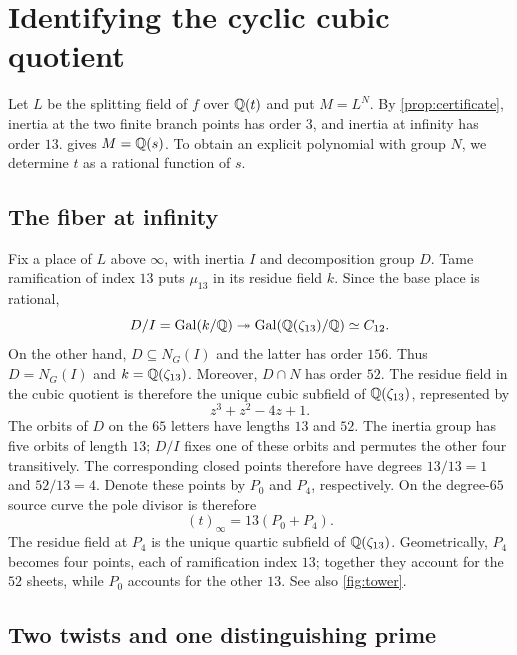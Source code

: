 \section{Identifying the cyclic cubic quotient}\label{sec:quotient}

Let $L$ be the splitting field of $f$ over $\mathbb{Q}(t)$ and put $M=L^N$.
By \cref{prop:certificate}, inertia at the two finite branch points has
order $3$, and inertia at infinity has order $13$.
 gives $M=\mathbb{Q}(s)$. To obtain an explicit
polynomial with group $N$, we determine $t$ as a rational function of $s$.

\subsection{The fiber at infinity}\label{sec:infinity}

Fix a place of $L$ above $\infty$, with inertia $I$ and decomposition
group $D$. Tame ramification of index $13$ puts $\mu_{13}$ in its residue
field $k$. Since the base place is rational,
\[
 D/I=\operatorname{Gal}(k/\mathbb{Q})\twoheadrightarrow
 \operatorname{Gal}(\mathbb{Q}(\zeta_{13})/\mathbb{Q})\simeq C_{12}.
\]
On the other hand, $D\subseteq N_G(I)$ and the latter has order $156$.
Thus $D=N_G(I)$ and $k=\mathbb{Q}(\zeta_{13})$.
Moreover, $D\cap N$ has order $52$. The residue field in the cubic
quotient is therefore the unique cubic subfield of $\mathbb{Q}(\zeta_{13})$,
represented by
\[
 z^3+z^2-4z+1.
\]
The orbits of $D$ on the $65$ letters have lengths $13$ and $52$.
The inertia group has five orbits of length $13$; $D/I$ fixes one of
these orbits and permutes the other four transitively. The corresponding
closed points therefore have degrees $13/13=1$ and $52/13=4$.
Denote these points by $P_0$ and $P_4$, respectively. On the degree-$65$
source curve the pole divisor is therefore
\begin{equation}\label{eq:polefiber}
 (t)_\infty=13(P_0+P_4).
\end{equation}
The residue field at $P_4$ is the unique quartic subfield of
$\mathbb{Q}(\zeta_{13})$. Geometrically, $P_4$ becomes four points, each of
ramification index $13$; together they account for the $52$ sheets,
while $P_0$ accounts for the other $13$. See also \cref{fig:tower}.

\subsection{Two twists and one distinguishing prime}

